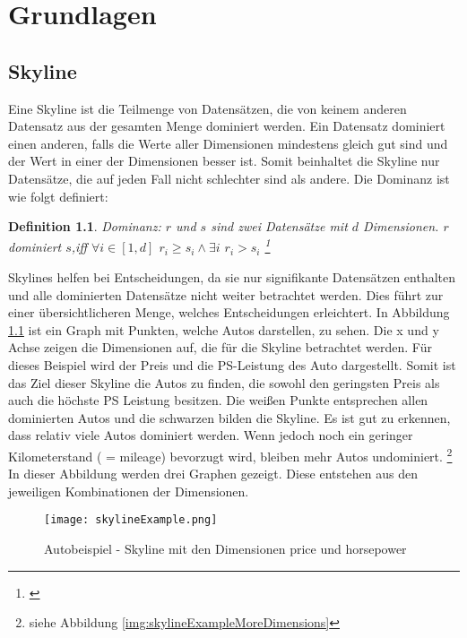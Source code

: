 \newtheorem{Def}{Definition}[chapter]
\chapter{Grundlagen}
\label{ch:Grundlagen} 
\section{Skyline}
\label{ch:Grundlagen:sec:skyline}
Eine Skyline ist die Teilmenge von Datensätzen, die von keinem anderen Datensatz aus der gesamten Menge dominiert werden. Ein Datensatz dominiert einen anderen, falls die Werte aller Dimensionen mindestens gleich gut sind und der Wert in einer der Dimensionen besser ist. Somit beinhaltet die Skyline nur Datensätze, die auf jeden Fall nicht schlechter sind als andere. Die Dominanz ist wie folgt definiert:

\begin{Def}
Dominanz: $r$ und $s$ sind zwei Datensätze mit $d$ Dimensionen. $r$ dominiert $s$,iff $\forall{i} \in{[1,d]}$ $r_i \geq s_i \land \exists{i}$ $r_i > s_i$ \footnote{\cite[p. 3]{magnani2014taking}}
\end{Def}

Skylines helfen bei Entscheidungen, da sie nur signifikante Datensätzen enthalten und alle dominierten Datensätze nicht weiter betrachtet werden. Dies führt zur einer übersichtlicheren Menge, welches Entscheidungen erleichtert.
In Abbildung \ref{img:skylineExample} ist ein Graph mit Punkten, welche Autos darstellen, zu sehen. Die x und y Achse zeigen die Dimensionen auf, die für die Skyline betrachtet werden. Für dieses Beispiel wird der Preis und die PS-Leistung des Auto dargestellt. Somit ist das Ziel dieser Skyline die Autos zu finden, die sowohl den geringsten Preis als auch die höchste PS Leistung besitzen.
Die weißen Punkte entsprechen allen dominierten Autos und die schwarzen bilden die Skyline. Es ist gut zu erkennen, dass relativ viele Autos dominiert werden. Wenn jedoch noch ein geringer Kilometerstand ( = mileage) bevorzugt wird, bleiben mehr Autos undominiert. \footnote{siehe Abbildung \ref{img:skylineExampleMoreDimensions}} In dieser Abbildung werden drei Graphen gezeigt. Diese entstehen aus den jeweiligen Kombinationen der Dimensionen.

\begin{figure}[H]
	\centering
	\texttt{[image: skylineExample.png]}
	\caption{Autobeispiel - Skyline mit den Dimensionen price und horsepower}
	\label{img:skylineExample}
\end{figure}


